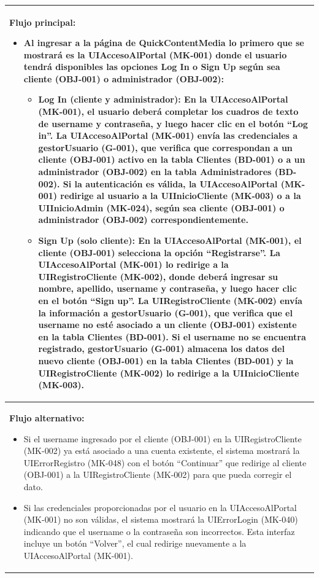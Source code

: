 \begin{longtable}{|p{15cm}|}
\textbf{Flujo principal:}
\begin{itemize}
\item Al ingresar a la página de QuickContentMedia lo primero que se mostrará es la UIAccesoAlPortal (MK-001) donde el usuario tendrá disponibles las opciones Log In o Sign Up según sea cliente (OBJ-001) o administrador (OBJ-002):
  \begin{itemize}
  \item \textbf{Log In (cliente y administrador): }En la UIAccesoAlPortal (MK-001), el usuario deberá completar los cuadros de texto de username y contraseña, y luego hacer clic en el botón “Log in”. La UIAccesoAlPortal (MK-001) envía las credenciales a gestorUsuario (G-001), que verifica que correspondan a un cliente (OBJ-001) activo en la tabla Clientes (BD-001) o a un administrador (OBJ-002) en la tabla Administradores (BD-002). Si la autenticación es válida, la UIAccesoAlPortal (MK-001) redirige al usuario a la UIInicioCliente (MK-003) o a la UIInicioAdmin (MK-024), según sea cliente (OBJ-001) o administrador (OBJ-002) correspondientemente.

  \item \textbf{Sign Up (solo cliente):} En la UIAccesoAlPortal (MK-001), el cliente (OBJ-001) selecciona la opción “Registrarse”. La UIAccesoAlPortal (MK-001) lo redirige a la UIRegistroCliente (MK-002), donde deberá ingresar su nombre, apellido, username y contraseña, y luego hacer clic en el botón “Sign up”. La UIRegistroCliente (MK-002) envía la información a gestorUsuario (G-001), que verifica que el username no esté asociado a un cliente (OBJ-001) existente en la tabla Clientes (BD-001). Si el username no se encuentra registrado, gestorUsuario (G-001) almacena los datos del nuevo cliente (OBJ-001) en la tabla Clientes (BD-001) y la UIRegistroCliente (MK-002) lo redirige a la UIInicioCliente (MK-003).
  \end{itemize}
\end{itemize} \\
\hline

\textbf{Flujo alternativo:}
\begin{itemize}
\item Si el username ingresado por el cliente (OBJ-001) en la UIRegistroCliente (MK-002) ya está asociado a una cuenta existente, el sistema mostrará la UIErrorRegistro (MK-048) con el botón “Continuar” que redirige al cliente (OBJ-001) a la UIRegistroCliente (MK-002) para que pueda corregir el dato.

\item Si las credenciales proporcionadas por el usuario en la UIAccesoAlPortal (MK-001) no son válidas, el sistema mostrará la UIErrorLogin (MK-040) indicando que el username o la contraseña son incorrectos. Esta interfaz incluye un botón “Volver”, el cual redirige nuevamente a la UIAccesoAlPortal (MK-001).
\end{itemize} \\
\hline


\end{longtable}
